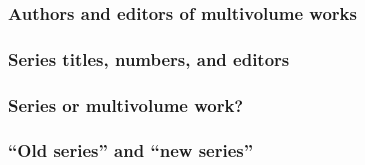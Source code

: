 \documentclass[11pt,letterpaper,oneside]{article}
\begin{document}
\begin{citebib}
\item \cite[351]{lach1977}
\item \cite{harley1994}
\end{citebib}

\subsubsection{Authors and editors of multivolume works}

\begin{citebib}
\item \cite{barrows1959}
\item \cite{donne1995}
\end{citebib}

\subsubsection{Series titles, numbers, and editors}
\label{14.123}

\begin{citebib}
\item \cite{lei2014}
\item \cite{mazrim2011}
\item \cite{wauchope1950}
\item \cite{allen2009}
\end{citebib}

\subsubsection{Series or multivolume work?}

\begin{citebib}
\item \cite{boyer1986}
\item \cite{cochrane1987}
\end{citebib}

\setcounter{subsubsection}{125}
\subsubsection{``Old series'' and ``new series''}
\label{14.126}

\begin{citebib}
\item \cite{boxer1953}
\item \cite{palmatary1950}
\end{citebib}
\end{document}
